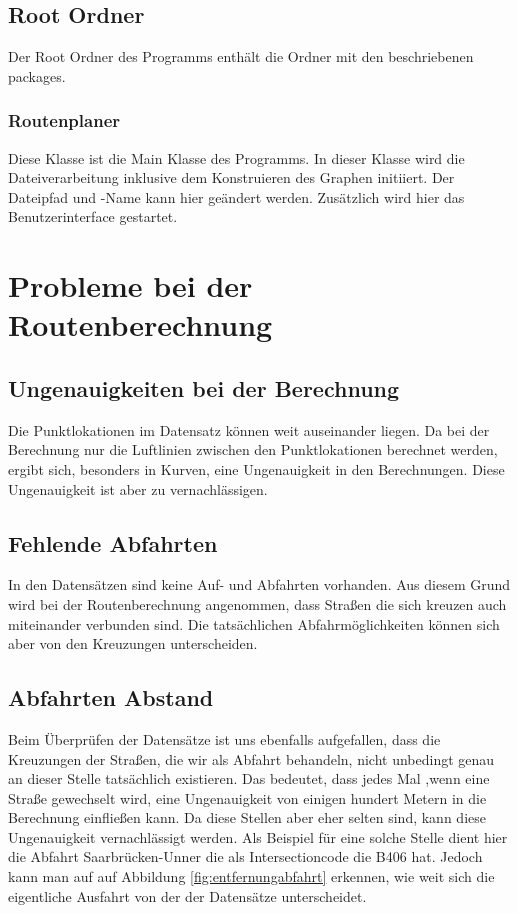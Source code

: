 \documentclass[12pt, a4paper, ngerman]{article}
\begin{document}
\subsection{Root Ordner}
Der Root Ordner des Programms enthält die Ordner mit den beschriebenen packages.

\subsubsection{Routenplaner \label{hello}}
Diese Klasse ist die Main Klasse des Programms. In dieser Klasse wird die Dateiverarbeitung inklusive dem Konstruieren des Graphen initiiert. Der Dateipfad und -Name kann hier geändert werden. Zusätzlich wird hier das Benutzerinterface gestartet.


\section{Probleme bei der Routenberechnung \label{Probleme}}
\subsection{Ungenauigkeiten bei der Berechnung}
Die Punktlokationen im Datensatz können weit auseinander liegen. Da bei der Berechnung nur die Luftlinien zwischen den Punktlokationen berechnet werden, ergibt sich, besonders in Kurven, eine Ungenauigkeit in den Berechnungen. Diese Ungenauigkeit ist aber zu vernachlässigen.

\subsection{Fehlende Abfahrten}
In den Datensätzen sind keine Auf- und Abfahrten vorhanden. Aus diesem Grund wird bei der Routenberechnung angenommen, dass Straßen die sich kreuzen auch miteinander verbunden sind. Die tatsächlichen Abfahrmöglichkeiten können sich aber von den Kreuzungen unterscheiden.

\subsection{Abfahrten Abstand}
Beim Überprüfen der Datensätze ist uns ebenfalls aufgefallen, dass die Kreuzungen der Straßen, die wir als Abfahrt behandeln, nicht unbedingt genau an dieser Stelle tatsächlich existieren. Das bedeutet, dass jedes Mal ,wenn eine Straße gewechselt wird, eine Ungenauigkeit von einigen hundert Metern in die Berechnung einfließen kann. Da diese Stellen aber eher selten sind, kann diese Ungenauigkeit vernachlässigt werden. Als Beispiel für eine solche Stelle dient hier die Abfahrt Saarbrücken-Unner die als Intersectioncode die B406 hat. Jedoch kann man auf auf Abbildung \ref{fig:entfernungabfahrt} erkennen, wie weit sich die eigentliche Ausfahrt von der der Datensätze unterscheidet.
\end{document}
